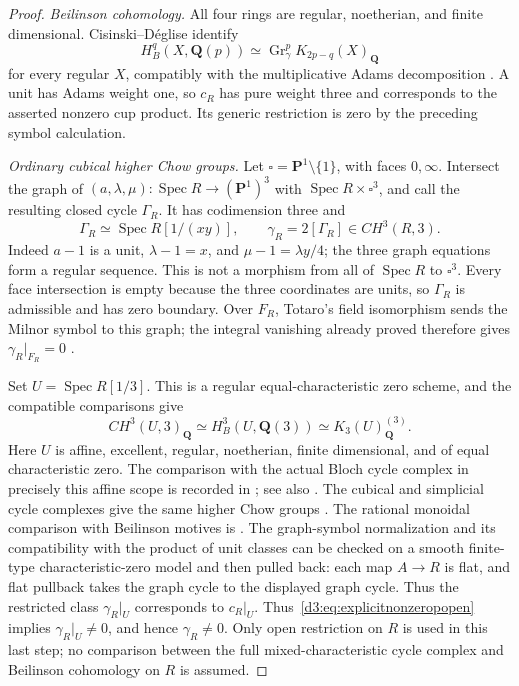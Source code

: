 \documentclass[11pt,a4paper]{amsart}
\numberwithin{equation}{section}
\theoremstyle{definition}
\theoremstyle{remark}
\begin{document}
\begin{proof}
\emph{Beilinson cohomology.}
All four rings are regular, noetherian, and finite dimensional.
Cisinski--D\'eglise identify
\[
 H_B^q(X,\mathbf Q(p))
 \simeq\operatorname{Gr}_\gamma^pK_{2p-q}(X)_{\mathbf Q}
\]
for every regular $X$, compatibly with the multiplicative Adams
decomposition \cite[Corollaries~14.2.14 and~14.2.19]{CisinskiDegliseMotives}.
A unit has Adams weight one, so $c_R$ has pure weight three and
corresponds to the asserted nonzero cup product. Its generic
restriction is zero by the preceding symbol calculation.

\emph{Ordinary cubical higher Chow groups.}
Let $\square=\mathbf P^1\setminus\{1\}$, with faces $0,\infty$.
Intersect the graph of
$(a,\lambda,\mu):\operatorname{Spec}R\to(\mathbf P^1)^3$ with
$\operatorname{Spec}R\times\square^3$, and call the resulting
closed cycle $\Gamma_R$. It has codimension three and
\[
 \Gamma_R\simeq\operatorname{Spec}R[1/(xy)],
 \qquad \gamma_R=2[\Gamma_R]\in CH^3(R,3).
\]
Indeed $a-1$ is a unit, $\lambda-1=x$, and
$\mu-1=\lambda y/4$; the three graph equations form a regular
sequence. This is not a morphism from all of $\operatorname{Spec}R$
to $\square^3$. Every face intersection is empty because the three
coordinates are units, so $\Gamma_R$ is admissible and has zero
boundary. Over $F_R$, Totaro's field isomorphism sends the Milnor
symbol to this graph; the integral vanishing already proved therefore
gives $\gamma_R|_{F_R}=0$
\cite[Theorem~1 and Sections~1--2]{TotaroMilnor}.

Set $U=\operatorname{Spec}R[1/3]$. This is a regular equal-characteristic
zero scheme, and the compatible comparisons give
\[
 CH^3(U,3)_{\mathbf Q}\simeq H_B^3(U,\mathbf Q(3))
       \simeq K_3(U)_{\mathbf Q}^{(3)}.
\]
Here $U$ is affine, excellent, regular, noetherian, finite dimensional,
and of equal characteristic zero. The comparison with the actual
Bloch cycle complex in precisely this affine scope is recorded in
\cite[Remark~1.3.2]{BondarkoIvanovChowWeights}; see also
\cite[Introduction~B, p.~xxii; Theorem~11.1.24 and
Examples~11.1.25 and~11.2.3]{CisinskiDegliseMotives}.
The cubical and simplicial cycle complexes give the same higher Chow
groups \cite[Theorem~4.7]{LevineHigherChowRevisited}.
The rational monoidal comparison with Beilinson motives is
\cite[Theorem~16.1.4 and Corollary~16.1.7]{CisinskiDegliseMotives}.
The graph-symbol normalization and its compatibility with the product
of unit classes can be checked on a smooth finite-type
characteristic-zero model and then pulled back: each map $A\to R$
is flat, and flat pullback takes the graph cycle to the displayed
graph cycle. Thus the restricted class $\gamma_R|_U$ corresponds to
$c_R|_U$.
Thus~\eqref{d3:eq:explicitnonzeropopen} implies
$\gamma_R|_U\ne0$, and hence $\gamma_R\ne0$.
Only open restriction on $R$ is used in this last step; no comparison
between the full mixed-characteristic cycle complex and Beilinson
cohomology on $R$ is assumed.
\end{proof}
\end{document}
